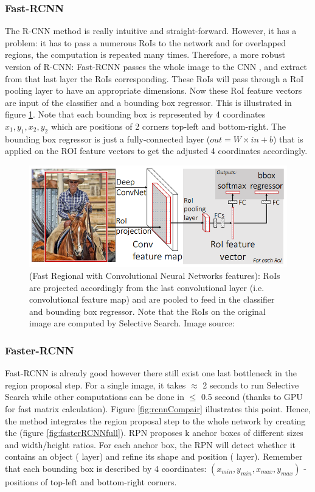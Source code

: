 \subsubsection{Fast-RCNN}
The R-CNN method is really intuitive and straight-forward. However, it has a problem: it has to pass a numerous RoIs to the network and for overlapped regions, the computation is repeated many times. Therefore, a more robust version of R-CNN: Fast-RCNN \cite{DBLP:journals/corr/Girshick15} passes the whole image to the CNN , and extract from that last layer the RoIs corresponding. These RoIs will pass through a RoI pooling layer to have an appropriate dimensions. Now these RoI feature vectors are input of the classifier and a bounding box regressor. This is illustrated in figure \ref{fig:fastRCNN}. Note that each bounding box is represented by 4 coordinates $x_1, y_1, x_2, y_2$ which are positions of 2 corners top-left and bottom-right. The bounding box regressor is just a fully-connected layer ($out = W\times in + b$) that is applied on the ROI feature vectors to get the adjusted 4 coordinates accordingly.
\begin{figure}[tb]
	\centering
	\includegraphics[width=0.9\hsize]{./figures/fastRCNN}
	\caption{ (Fast Regional with Convolutional Neural Networks features): RoIs are projected accordingly from the last convolutional layer (i.e. convolutional feature map) and are pooled to feed in the classifier and bounding box regressor. Note that the RoIs on the original image are computed by Selective Search. Image source: \cite{DBLP:journals/corr/Girshick15}}
	\label{fig:fastRCNN}
\end{figure}

\subsubsection{Faster-RCNN}
Fast-RCNN is already good however there still exist one last bottleneck in the region proposal step. For a single image, it takes $\approx$ 2 seconds to run Selective Search while other computations can be done in $\leq$ 0.5 second (thanks to GPU for fast matrix calculation). Figure \ref{fig:rcnnCompair} illustrates this point. Hence, the  method \cite{DBLP:journals/corr/RenHG015} integrates the region proposal step to the whole network by creating the   (figure \ref{fig:fasterRCNNfull}). RPN proposes k anchor boxes of different sizes and width/height ratios. For each anchor box, the RPN will detect whether it contains an object ( layer) and refine its shape and position ( layer). Remember that each bounding box is described by 4 coordinates: $(x_{min}, y_{min}, x_{max}, y_{max})$ - positions of top-left and bottom-right corners.

